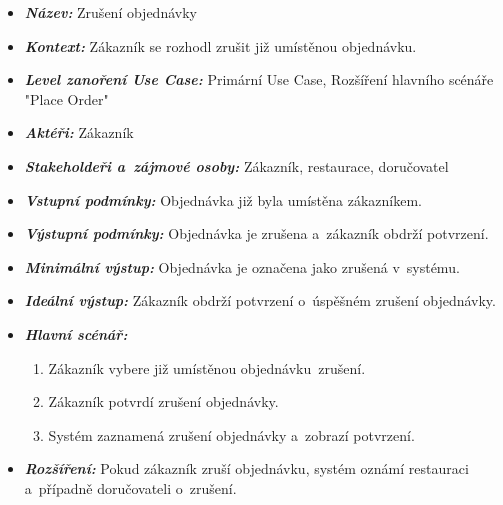 	\begin{itemize}[itemsep=0pt]
        \item \textbf{\textit{Název:}} Zrušení objednávky
        \item \textbf{\textit{Kontext:}} Zákazník se rozhodl zrušit již umístěnou objednávku.
        \item \textbf{\textit{Level zanoření Use Case:}} Primární Use Case, Rozšíření hlavního scénáře "Place Order"
        \item \textbf{\textit{Aktéři:}} Zákazník
        \item \textbf{\textit{Stakeholdeři a~zájmové osoby:}} Zákazník, restaurace, doručovatel
        \item \textbf{\textit{Vstupní podmínky:}} Objednávka již byla umístěna zákazníkem.
        \item \textbf{\textit{Výstupní podmínky:}} Objednávka je zrušena a~zákazník obdrží potvrzení.
        \item \textbf{\textit{Minimální výstup:}} Objednávka je označena jako zrušená v~systému.
        \item \textbf{\textit{Ideální výstup:}} Zákazník obdrží potvrzení o~úspěšném zrušení objednávky.
        \item \textbf{\textit{Hlavní scénář:}}
			\begin{enumerate}[topsep=0pt]
            	\item Zákazník vybere již umístěnou objednávku~zrušení.
            	\item Zákazník potvrdí zrušení objednávky.
            	\item Systém zaznamená zrušení objednávky a~zobrazí potvrzení.
			\end{enumerate}
        \item \textbf{\textit{Rozšíření:}} Pokud zákazník zruší objednávku, systém oznámí restauraci a~případně doručovateli o~zrušení.
	\end{itemize}

